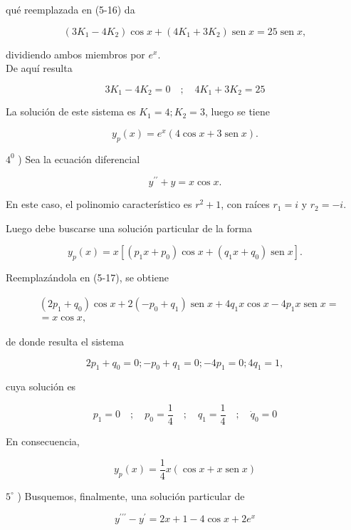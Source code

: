 \documentclass[10pt]{article}
\theoremstyle{plain}
\theoremstyle{definition}
\theoremstyle{remark}
\begin{document}
qué reemplazada en (5-16) da

$$
\left(3 K_{1}-4 K_{2}\right) \cos x+\left(4 K_{1}+3 K_{2}\right) \operatorname{sen} x=25 \operatorname{sen} x,
$$

dividiendo ambos miembros por $e^{x}$.\\
De aquí resulta

$$
3 K_{1}-4 K_{2}=0 \quad ; \quad 4 K_{1}+3 K_{2}=25
$$

La solución de este sistema es $K_{1}=4 ; K_{2}=3$, luego se tiene

$$
y_{p}(x)=e^{x}(4 \cos x+3 \operatorname{sen} x) .
$$

$4^{0}$ ) Sea la ecuación diferencial


\begin{equation*}
y^{\prime \prime}+y=x \cos x . \tag{5-17}
\end{equation*}


En este caso, el polinomio característico es $r^{2}+1$, con raíces $r_{1}=i$ y $r_{2}=-i$.

Luego debe buscarse una solución particular de la forma

$$
y_{p}(x)=x\left[\left(p_{1} x+p_{0}\right) \cos x+\left(q_{1} x+q_{0}\right) \operatorname{sen} x\right] .
$$

Reemplazándola en (5-17), se obtiene

$$
\begin{aligned}
& \left(2 p_{1}+q_{0}\right) \cos x+2\left(-p_{0}+q_{1}\right) \operatorname{sen} x+4 q_{1} x \cos x-4 p_{1} x \operatorname{sen} x= \\
& =x \cos x,
\end{aligned}
$$

de donde resulta el sistema

$$
2 p_{1}+q_{0}=0 ;-p_{0}+q_{1}=0 ;-4 p_{1}=0 ; 4 q_{1}=1,
$$

cuya solución es

$$
p_{1}=0 \quad ; \quad p_{0}=\frac{1}{4} \quad ; \quad q_{1}=\frac{1}{4} \quad ; \quad \dot{q}_{0}=0
$$

En consecuencia,

$$
y_{p}(x)=\frac{1}{4} x(\cos x+x \operatorname{sen} x)
$$

$5^{\circ}$ ) Busquemos, finalmente, una solución particular de


\begin{equation*}
y^{\prime \prime \prime}-y^{\prime}=2 x+1-4 \cos x+2 e^{x} \tag{5-18}
\end{equation*}
\end{document}
